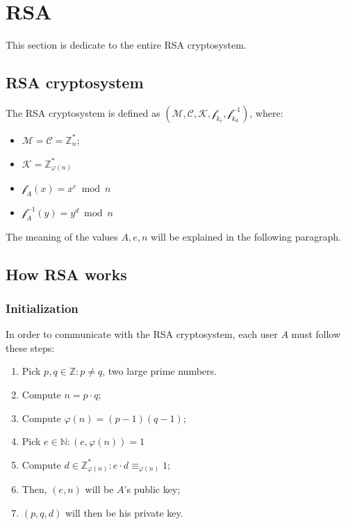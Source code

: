 \section{RSA}
This section is dedicate to the entire RSA cryptosystem.
\subsection{RSA cryptosystem}
\begin{definition}
    The RSA cryptosystem is defined as $(\mathcal{M},\mathcal{C},\mathcal{K}, \mathscr{f}_{k_{e}},\mathscr{f}_{k_{d}}^{-1})$, where:
    \begin{itemize}
        \item $\mathcal{M} = \mathcal{C} = \mathbb{Z}_{n}^{*}$;
        \item $\mathcal{K} = \mathbb{Z}_{\varphi(n)}^{*}$
        \item $\mathscr{f}_{A}(x) = x^{e} \bmod n$
        \item $\mathscr{f}_{A}^{-1}(y) = y^{d} \bmod n$
    \end{itemize}
    The meaning of the values $A, e, n$ will be explained in the following paragraph.
\end{definition}

\subsection{How RSA works}
\subsubsection{Initialization}
In order to communicate with the RSA cryptosystem, each user $A$ must follow these steps:
\begin{enumerate}
    \item Pick $p, q \in \mathbb{Z}: p \neq q$, two large prime numbers.
    \item Compute $n = p \cdot q$;
    \item Compute $\varphi(n) = (p - 1)(q - 1)$;
    \item Pick $e \in \mathbb{N}: (e, \varphi(n)) = 1$
    \item Compute $d \in \mathbb{Z}_{\varphi(n)}^{*}: e \cdot d \equiv_{\varphi(n)} 1$;
    \item Then, $(e,n)$ will be $A$'s public key;
    \item $(p, q, d)$ will then be his private key.
\end{enumerate}
